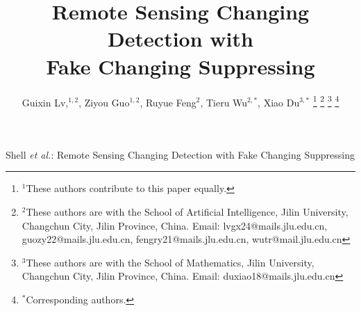 \documentclass[lettersize,journal]{IEEEtran}
\begin{document}
    \title{Remote Sensing Changing Detection with\\ Fake Changing Suppressing}
    
    \author{
        Guixin Lv,$^{1,2}$,
        Ziyou Guo$^{1,2}$,
        Ruyue Feng$^{2}$,
        Tieru Wu$^{2,*}$,
        Xiao Du$^{3,*}$    
        \thanks{$^{1}$These authors contribute to this paper equally.}
        \thanks{$^{2}$These authors are with the School of Artificial Intelligence, Jilin University, Changchun City, Jilin Province, China. Email: lvgx24@mails.jlu.edu.cn, guozy22@mails.jlu.edu.cn, fengry21@mails.jlu.edu.cn, wutr@mail.jlu.edu.cn}
        \thanks{$^{3}$These authors are with the School of Mathematics, Jilin University, Changchun City, Jilin Province, China. Email: duxiao18@mails.jlu.edu.cn}
        \thanks{$^{*}$Corresponding authors.}
    }    
    
    {Shell \MakeLowercase{\textit{et al.}}: Remote Sensing Changing Detection with Fake Changing Suppressing}
    
    
    \maketitle    
    
    
    
    
    
    
    
    
    
    
    
    
    
           
    
        
    
        
    
    
    \newpage    
    
        
\end{document}
